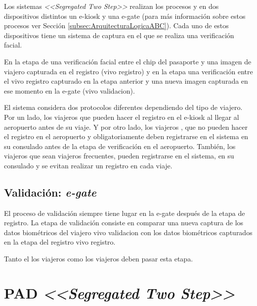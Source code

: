Los sistemas \textit{<<Segregated Two Step>>} realizan los procesos  y  en dos dispositivos distintos un \gls{e-kiosk} y una \gls{e-gate} (para más información sobre estos procesos ver Sección \ref{subsec:ArquitecturaLogicaABC}). Cada uno de estos dispositivos tiene un sistema de captura en el que se realiza una verificación facial.

En la etapa de  una verificación facial entre el \gls{chip} del pasaporte y una imagen de viajero capturada en el registro (\gls{vivo registro}) y en la etapa  una verificación entre el \gls{vivo registro} capturado en la etapa anterior y una nueva imagen capturada en ese momento en la \gls{e-gate} (\gls{vivo validacion}).
\color{black}

El sistema considera dos protocolos diferentes dependiendo del tipo de viajero. Por un lado, los viajeros  que pueden hacer el registro  en el \gls{e-kiosk} al llegar al aeropuerto antes de su viaje. Y por otro lado, los viajeros , que no pueden hacer el registro en el aeropuerto y obligatoriamente deben registrarse en el sistema en su consulado antes de la etapa de verificación en el aeropuerto. También, los viajeros  que sean viajeros frecuentes, pueden registrarse en el sistema, en su consulado y se evitan realizar un registro en cada viaje. 

\subsection{Validación: \textit{e-gate}}

El proceso de validación siempre tiene lugar en la \gls{e-gate} después de la etapa de registro. La etapa de validación consiste en comparar una nueva captura de los datos biométricos del viajero \gls{vivo validacion} con los datos biométricos capturados en la etapa del registro \gls{vivo registro}.

Tanto el los viajeros  como los viajeros  deben pasar esta etapa.

\section{PAD \textit{<<Segregated Two Step>>}}\label{sec:PADSegregado}

